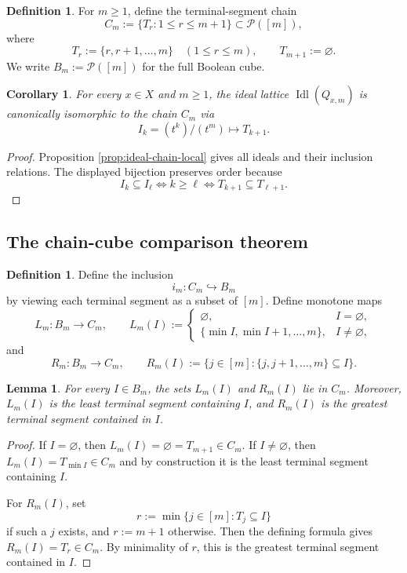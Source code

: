 \documentclass[11pt,a4paper]{article}
\newtheorem{lemma}[theorem]{Lemma}
\newtheorem{corollary}[theorem]{Corollary}
\theoremstyle{definition}
\newtheorem{definition}[theorem]{Definition}
\theoremstyle{remark}
\DeclareMathOperator{\Idl}{Idl}
\newcommand{\cP}{\mathcal P}
\newcommand{\into}{\hookrightarrow}
\begin{document}
\begin{definition}
For $m\ge1$, define the terminal-segment chain
\[
C_m:=\{T_r:1\le r\le m+1\}\subset \cP([m]),
\]
where
\[
T_r:=\{r,r+1,\dots,m\}\quad (1\le r\le m),
\qquad
T_{m+1}:=\varnothing.
\]
We write $B_m:=\cP([m])$ for the full Boolean cube.
\end{definition}

\begin{corollary}\label{cor:ideal-chain-identification}
For every $x\in X$ and $m\ge1$, the ideal lattice $\Idl(Q_{x,m})$ is canonically isomorphic to the chain $C_m$ via
\[
I_k=(t^k)/(t^m)\longmapsto T_{k+1}.
\]
\end{corollary}

\begin{proof}
Proposition \ref{prop:ideal-chain-local} gives all ideals and their inclusion relations.  The displayed bijection preserves order because
\[
I_k\subseteq I_\ell\iff k\ge \ell
\iff T_{k+1}\subseteq T_{\ell+1}.
\]
\end{proof}

\subsection{The chain-cube comparison theorem}

\begin{definition}
Define the inclusion
\[
i_m:C_m\into B_m
\]
by viewing each terminal segment as a subset of $[m]$.  Define monotone maps
\[
L_m:B_m\to C_m,
\qquad
L_m(I):=\begin{cases}
\varnothing,& I=\varnothing,\\
\{\min I,\min I+1,\dots,m\},& I\neq\varnothing,
\end{cases}
\]
and
\[
R_m:B_m\to C_m,
\qquad
R_m(I):=\{j\in [m]:\{j,j+1,\dots,m\}\subseteq I\}.
\]
\end{definition}

\begin{lemma}\label{lem:LRtails}
For every $I\in B_m$, the sets $L_m(I)$ and $R_m(I)$ lie in $C_m$.  Moreover, $L_m(I)$ is the least terminal segment containing $I$, and $R_m(I)$ is the greatest terminal segment contained in $I$.
\end{lemma}

\begin{proof}
If $I=\varnothing$, then $L_m(I)=\varnothing=T_{m+1}\in C_m$.  If $I\neq\varnothing$, then $L_m(I)=T_{\min I}\in C_m$ and by construction it is the least terminal segment containing $I$.

For $R_m(I)$, set
\[
r:=\min\{j\in[m]:T_j\subseteq I\}
\]
if such a $j$ exists, and $r:=m+1$ otherwise.  Then the defining formula gives $R_m(I)=T_r\in C_m$.  By minimality of $r$, this is the greatest terminal segment contained in $I$.
\end{proof}
\end{document}
